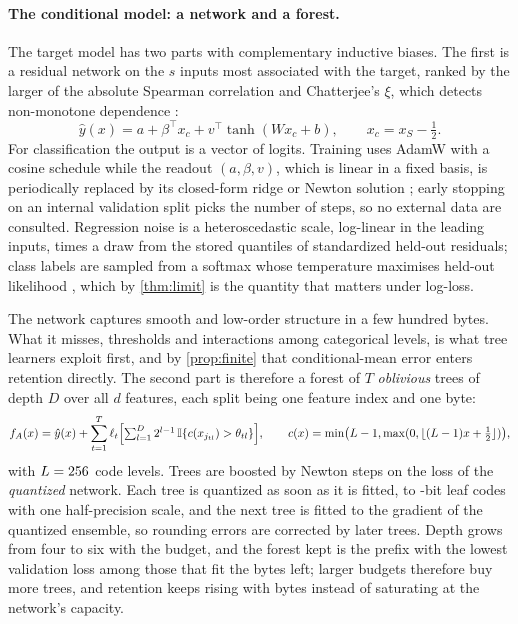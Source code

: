 \paragraph{The conditional model: a network and a forest.}
The target model has two parts with complementary inductive biases. The first is a residual network
on the $s$ inputs most associated with the target, ranked by the larger of the absolute Spearman
correlation and Chatterjee's $\xi$, which detects non-monotone dependence \citep{chatterjee2021xi}:
\begin{equation}
  \hat y(x)=a+\beta^\top x_c+v^\top\tanh(Wx_c+b),\qquad x_c=x_S-\tfrac12 .
  \label{eq:net}
\end{equation}
For classification the output is a vector of logits. Training uses AdamW
\citep{loshchilov2019adamw} with a cosine schedule while the readout $(a,\beta,v)$, which is linear in a
fixed basis, is periodically replaced by its closed-form ridge or Newton solution
\citep[variable projection;][]{golub1973varpro}; early stopping on an internal validation split picks the
number of steps, so no external data are consulted. Regression noise is a heteroscedastic scale,
log-linear in the leading inputs, times a draw from the stored quantiles of standardized held-out
residuals; class labels are sampled from a softmax whose temperature maximises held-out likelihood
\citep{guo2017calibration}, which by \cref{thm:limit} is the quantity that matters under log-loss.

The network captures smooth and low-order structure in a few hundred bytes. What it misses,
thresholds and interactions among categorical levels, is what tree learners exploit first, and by
\cref{prop:finite} that conditional-mean error enters retention directly. The second part is
therefore a forest of $T$ \emph{oblivious} trees of depth $D$ \citep{prokhorenkova2018catboost} over
all $d$ features, each split being one feature index and one byte:
\begin{equation}
  f_A(x)=\hat y(x)+\sum_{t=1}^{T}\ell_t\Bigl[\textstyle\sum_{l=1}^{D}2^{l-1}\,
  \mathbb{I}\{c(x_{j_{tl}})>\theta_{tl}\}\Bigr],\qquad
  c(x)=\min\bigl(L-1,\max(0,\lfloor(L-1)x+\tfrac12\rfloor)\bigr),
  \label{eq:forest}
\end{equation}
with $L=256$ code levels. Trees are boosted by Newton steps on the loss of the
\emph{quantized} network. Each tree is quantized as soon as it is fitted, to \CfgLeafBits-bit leaf
codes with one half-precision scale, and the next tree is fitted to the gradient of the quantized
ensemble, so rounding errors are corrected by later trees. Depth grows from four to six with the
budget, and the forest kept is the prefix with the lowest validation loss among those that fit the
bytes left; larger budgets therefore buy more trees, and retention keeps rising with bytes instead of
saturating at the network's capacity.

